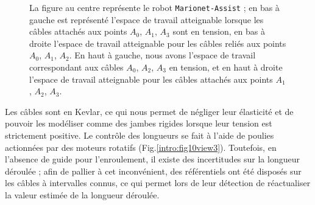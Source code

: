 \begin{figure}[!ht]
\centering
\def\svgwidth{.90\linewidth}

\caption{\footnotesize{La figure au centre représente le robot {\tt Marionet-Assist} ; en bas à gauche est représenté l'espace de travail atteignable lorsque les câbles attachés aux points $A_0$, $A_1$, $A_3$ sont en tension, en bas à droite l'espace de travail atteignable pour les câbles reliés aux points $A_0$, $A_1$, $A_2$. En haut à gauche, nous avons l'espace de travail correspondant aux câbles $A_0$, $A_2$, $A_3$ en tension, et en haut à droite l'espace de travail atteignable pour les câbles attachés aux points $A_1$, $A_2$, $A_3$.}}
\label{intro:fig11}
\end{figure}

Les câbles sont en Kevlar, ce qui nous permet de négliger leur élasticité et de pouvoir les modéliser comme des jambes rigides lorsque leur tension est strictement positive. Le contrôle des longueurs se fait à l'aide de poulies actionnées par des moteurs rotatifs (Fig.\ref{intro:fig10view3}). Toutefois, en l'absence de guide pour l'enroulement, il existe des incertitudes sur la longueur déroulée ; afin de pallier à cet inconvénient, des référentiels ont été disposés sur les câbles à intervalles connus, ce qui permet lors de leur détection de réactualiser la valeur estimée de la longueur déroulée.

